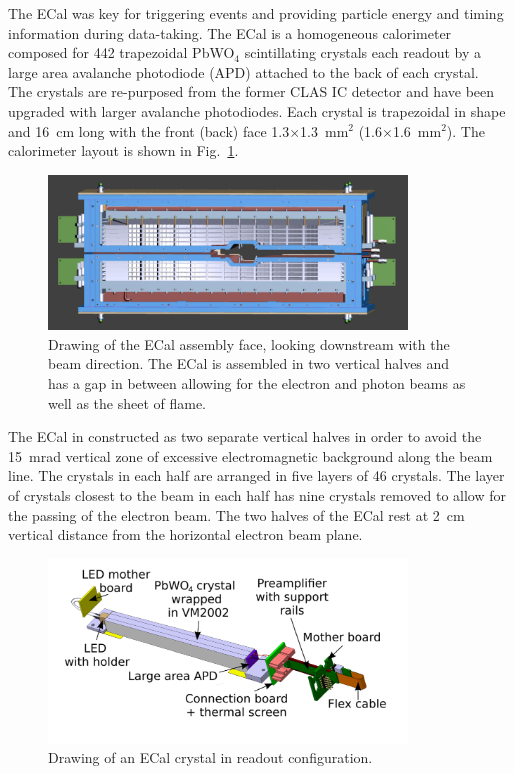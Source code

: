 The ECal was key for triggering events and providing particle energy and timing information during data-taking. The ECal is a homogeneous calorimeter composed for 442 trapezoidal PbWO$_4$ scintillating crystals each readout by a large area avalanche photodiode (APD) attached to the back of each crystal.~\cite{Balossino} The crystals are re-purposed from the former CLAS IC detector and have been upgraded with larger avalanche photodiodes. Each crystal is trapezoidal in shape and 16~cm long with the front (back) face 1.3$\times$1.3~mm$^2$ (1.6$\times$1.6~mm$^2$). The calorimeter layout is shown in Fig.~\ref{Figure:ecalface}. 

\begin{figure}[thb]
  \centering
      \includegraphics[width=0.85\textwidth]{pics/experiment/ecalface.png}
  \caption[Drawing of the ECal assembly face]{Drawing of the ECal assembly face, looking downstream with the beam direction. The ECal is assembled in two vertical halves and has a gap in between allowing for the electron and photon beams as well as the sheet of flame.}
  \label{Figure:ecalface}
\end{figure}

The ECal in constructed as two separate vertical halves in order to avoid the 15~mrad vertical zone of excessive electromagnetic background along the beam line. The crystals in each half are arranged in five layers of 46 crystals. The layer of crystals closest to the beam in each half has nine crystals removed to allow for the passing of the electron beam. The two halves of the ECal rest at 2~cm vertical distance from the  horizontal electron beam plane.

\begin{figure}[thb]
  \centering
      \includegraphics[width=0.85\textwidth]{pics/experiment/crystal.png}
  \caption[Single ECal module]{Drawing of an ECal crystal in readout configuration.}
  \label{Figure:crystal}
\end{figure}

